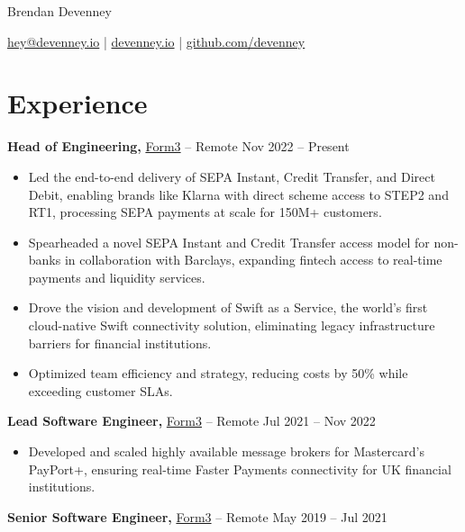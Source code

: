 \documentclass[11pt]{article}       %
\begin{document}
\centerline{\Huge Brendan Devenney}

\vspace{5pt}

\centerline{\href{mailto:hey@devenney.io}{hey@devenney.io} | \href{https://devenney.io}{devenney.io} | \href{https://github.com/devenney}{github.com/devenney}}

\vspace{-10pt}

\section*{Experience}

\textbf{Head of Engineering,} \href{https://form3.tech/}{Form3} -- Remote \hfill Nov 2022 -- Present \\
\vspace{-9pt}
\begin{itemize}
  \item Led the end-to-end delivery of SEPA Instant, Credit Transfer, and Direct Debit, enabling brands like Klarna\cite{klarna} with direct scheme access to STEP2 and RT1, processing SEPA payments at scale for 150M+ customers.  
  \item Spearheaded a novel SEPA Instant and Credit Transfer access model for non-banks in collaboration with Barclays, expanding fintech access to real-time payments and liquidity services.  
  \item Drove the vision and development of Swift as a Service\cite{swift}, the world's first cloud-native Swift connectivity solution, eliminating legacy infrastructure barriers for financial institutions.  
  \item Optimized team efficiency and strategy, reducing costs by 50\% while exceeding customer SLAs.        
\end{itemize}

\textbf{Lead Software Engineer,} \href{https://form.tech/}{Form3} -- Remote \hfill Jul 2021 -- Nov 2022 \\
\vspace{-9pt}
\begin{itemize}
  \item Developed and scaled highly available message brokers for Mastercard’s PayPort+\cite{payport}, ensuring real-time Faster Payments connectivity for UK financial institutions.
\end{itemize}

\textbf{Senior Software Engineer,} \href{https://form3.tech/}{Form3} -- Remote \hfill May 2019 -- Jul 2021 \\
\vspace{6.5pt}
\end{document}
